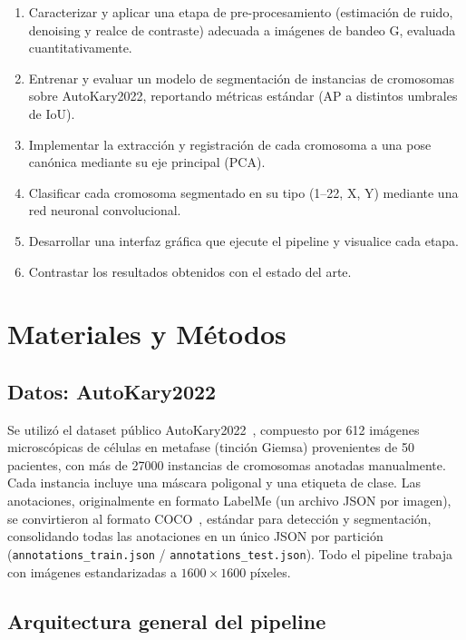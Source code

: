 \documentclass[11pt,a4paper]{article}
\begin{document}
\begin{enumerate}[topsep=2pt,itemsep=1pt]
  \item Caracterizar y aplicar una etapa de pre-procesamiento (estimación de
        ruido, denoising y realce de contraste) adecuada a imágenes de bandeo G,
        evaluada cuantitativamente.
  \item Entrenar y evaluar un modelo de segmentación de instancias de cromosomas
        sobre AutoKary2022, reportando métricas estándar (AP a distintos umbrales
        de IoU).
  \item Implementar la extracción y registración de cada cromosoma a una pose
        canónica mediante su eje principal (PCA).
  \item Clasificar cada cromosoma segmentado en su tipo (1--22, X, Y) mediante una
        red neuronal convolucional.
  \item Desarrollar una interfaz gráfica que ejecute el pipeline y visualice cada
        etapa.
  \item Contrastar los resultados obtenidos con el estado del arte.
\end{enumerate}

\section{Materiales y Métodos}

\subsection{Datos: AutoKary2022}

Se utilizó el dataset público AutoKary2022~\cite{you2023autokary}, compuesto por
612 imágenes microscópicas de células en metafase (tinción Giemsa) provenientes de
50 pacientes, con más de 27000 instancias de cromosomas anotadas manualmente. Cada
instancia incluye una máscara poligonal y una etiqueta de clase. Las anotaciones,
originalmente en formato LabelMe (un archivo JSON por imagen), se convirtieron al
formato COCO~\cite{lin2014coco}, estándar para detección y segmentación,
consolidando todas las anotaciones en un único JSON por partición
(\texttt{annotations\_train.json} / \texttt{annotations\_test.json}). Todo el
pipeline trabaja con imágenes estandarizadas a \(1600 \times 1600\) píxeles.

\subsection{Arquitectura general del pipeline}
\end{document}
